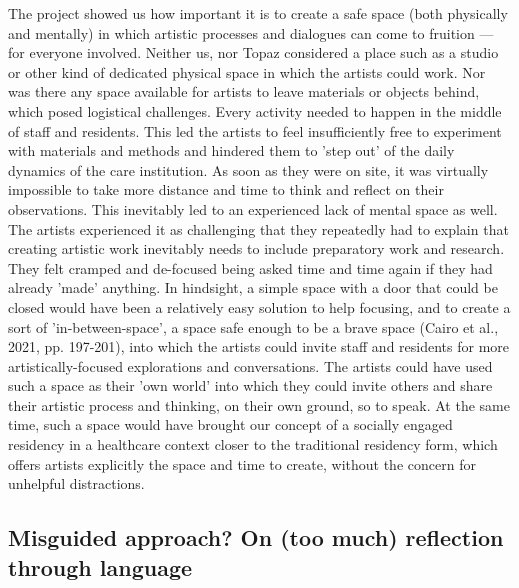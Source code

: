 \documentclass[authordate, empirical]{jote-new-article}
\begin{document}
	The project showed us how important it is to create a safe space (both physically and mentally) in which artistic processes and dialogues can come to fruition --- for everyone involved. Neither us, nor Topaz considered a place such as a studio or other kind of dedicated physical space in which the artists could work. Nor was there any space available for artists to leave materials or objects behind, which posed logistical challenges. Every activity needed to happen in the middle of staff and residents. This led the artists to feel insufficiently free to experiment with materials and methods and hindered them to 'step out' of the daily dynamics of the care institution. As soon as they were on site, it was virtually impossible to take more distance and time to think and reflect on their observations. This inevitably led to an experienced lack of mental space as well. The artists experienced it as challenging that they repeatedly had to explain that creating artistic work inevitably needs to include preparatory work and research. They felt cramped and de-focused being asked time and time again if they had already 'made' anything. In hindsight, a simple space with a door that could be closed would have been a relatively easy solution to help focusing, and to create a sort of 'in-between-space', a space safe enough to be a brave space (Cairo et al., 2021, pp. 197-201), into which the artists could invite staff and residents for more artistically-focused explorations and conversations. The artists could have used such a space as their 'own world' into which they could invite others and share their artistic process and thinking, on their own ground, so to speak. At the same time, such a space would have brought our concept of a socially engaged residency in a healthcare context closer to the traditional residency form, which offers artists explicitly the space and time to create, without the concern for unhelpful distractions.







	\subsection{Misguided approach? On (too much) reflection through language}
\end{document}
